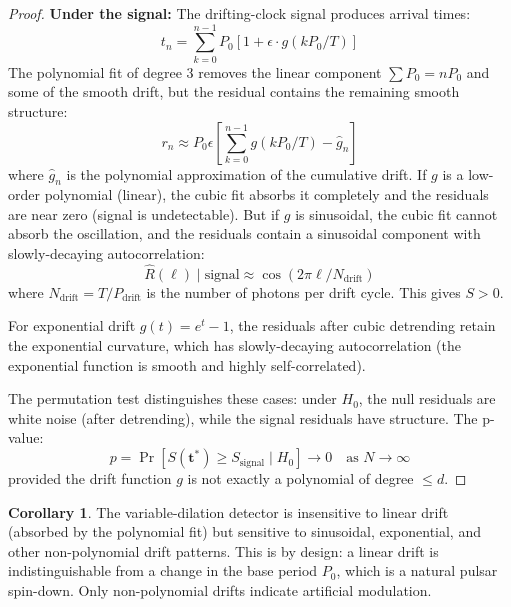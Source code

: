 \documentclass[11pt]{article}
\theoremstyle{definition}
\newtheorem{corollary}[theorem]{Corollary}
\begin{document}
\begin{proof}
\textbf{Under the signal:} The drifting-clock signal produces arrival times:
\begin{equation}
t_n = \sum_{k=0}^{n-1} P_0 [1 + \epsilon \cdot g(kP_0 / T)]
\end{equation}
The polynomial fit of degree 3 removes the linear component $\sum P_0 = n P_0$ and some of the smooth drift, but the residual contains the remaining smooth structure:
\begin{equation}
r_n \approx P_0 \epsilon \left[\sum_{k=0}^{n-1} g(kP_0/T) - \hat{g}_n\right]
\end{equation}
where $\hat{g}_n$ is the polynomial approximation of the cumulative drift. If $g$ is a low-order polynomial (linear), the cubic fit absorbs it completely and the residuals are near zero (signal is undetectable). But if $g$ is sinusoidal, the cubic fit cannot absorb the oscillation, and the residuals contain a sinusoidal component with slowly-decaying autocorrelation:
\begin{equation}
\hat{R}(\ell) \mid \text{signal} \approx \cos(2\pi \ell / N_{\text{drift}})
\end{equation}
where $N_{\text{drift}} = T / P_{\text{drift}}$ is the number of photons per drift cycle. This gives $S > 0$.

For exponential drift $g(t) = e^t - 1$, the residuals after cubic detrending retain the exponential curvature, which has slowly-decaying autocorrelation (the exponential function is smooth and highly self-correlated).

The permutation test distinguishes these cases: under $H_0$, the null residuals are white noise (after detrending), while the signal residuals have structure. The p-value:
\begin{equation}
p = \Pr[S(\mathbf{t}^{\ast}) \ge S_{\text{signal}} \mid H_0] \to 0 \quad \text{as } N \to \infty
\end{equation}
provided the drift function $g$ is not exactly a polynomial of degree $\le d$.
\end{proof}

\begin{corollary}
The variable-dilation detector is insensitive to linear drift (absorbed by the polynomial fit) but sensitive to sinusoidal, exponential, and other non-polynomial drift patterns. This is by design: a linear drift is indistinguishable from a change in the base period $P_0$, which is a natural pulsar spin-down. Only non-polynomial drifts indicate artificial modulation.
\end{corollary}
\end{document}
